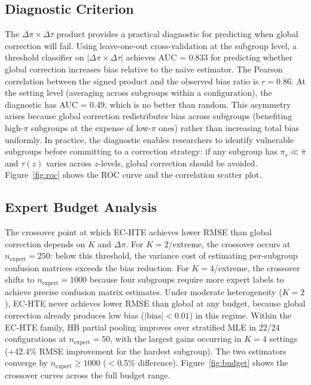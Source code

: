 \subsection{Diagnostic Criterion}
\label{sec:diagnostic}

The $\Delta\pi \times \Delta\tau$ product provides a practical diagnostic for predicting when global correction will fail.
Using leave-one-out cross-validation at the subgroup level, a threshold classifier on $|\Delta\pi \times \Delta\tau|$ achieves AUC = 0.833 for predicting whether global correction increases bias relative to the naive estimator.
The Pearson correlation between the signed product and the observed bias ratio is $r = 0.86$.
At the setting level (averaging across subgroups within a configuration), the diagnostic has AUC = 0.49, which is no better than random.
This asymmetry arises because global correction redistributes bias across subgroups (benefiting high-$\pi$ subgroups at the expense of low-$\pi$ ones) rather than increasing total bias uniformly.
In practice, the diagnostic enables researchers to identify vulnerable subgroups before committing to a correction strategy: if any subgroup has $\pi_s \ll \bar{\pi}$ and $\tau(z)$ varies across $z$-levels, global correction should be avoided.
Figure~\ref{fig:roc} shows the ROC curve and the correlation scatter plot.

\subsection{Expert Budget Analysis}
\label{sec:budget}

The crossover point at which EC-HTE achieves lower RMSE than global correction depends on $K$ and $\Delta\pi$.
For $K{=}2$/extreme, the crossover occurs at $n_{\text{expert}} = 250$: below this threshold, the variance cost of estimating per-subgroup confusion matrices exceeds the bias reduction.
For $K{=}4$/extreme, the crossover shifts to $n_{\text{expert}} = 1000$ because four subgroups require more expert labels to achieve precise confusion matrix estimates.
Under moderate heterogeneity ($K{=}2$), EC-HTE never achieves lower RMSE than global at any budget, because global correction already produces low bias ($|\text{bias}|{<}0.01$) in this regime.
Within the EC-HTE family, HB partial pooling improves over stratified MLE in 22/24 configurations at $n_{\text{expert}}{=}50$, with the largest gains occurring in $K{=}4$ settings (+42.4\% RMSE improvement for the hardest subgroup).
The two estimators converge by $n_{\text{expert}} \geq 1000$ ($<$0.5\% difference).
Figure~\ref{fig:budget} shows the crossover curves across the full budget range.

